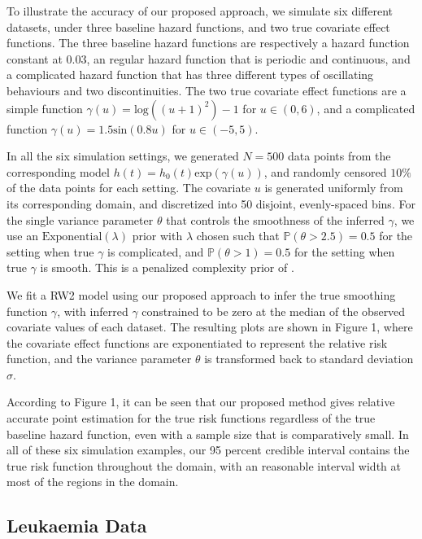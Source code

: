 \documentclass[ba]{imsart}
\begin{document}
To illustrate the accuracy of our proposed approach, we simulate six different datasets, under three baseline hazard functions, and two true covariate effect functions. The three baseline hazard functions are respectively a hazard function constant at 0.03, an regular hazard function that is periodic and continuous, and a complicated hazard function that has three different types of oscillating behaviours and two discontinuities. The two true covariate effect functions are a simple function $\gamma(u) = \text{log}((u + 1)^2) - 1$ for $u \in (0,6)$, and a complicated function $\gamma(u) = 1.5 \text{sin}(0.8 u)$ for $ u \in (-5,5)$.

In all the six simulation settings, we  generated $N = 500$ data points from the corresponding model $h(t) = h_{0}(t) \text{exp}(\gamma(u))$, and randomly censored $10\%$ of the data points for each setting. The covariate $u$ is generated uniformly from its corresponding domain, and discretized into 50 disjoint, evenly-spaced bins. For the single variance parameter $\theta$ that controls the smoothness of the inferred $\gamma$, we use an $\text{Exponential}(\lambda)$ prior with $\lambda$ chosen such that $\mathbb{P}\left( \theta > 2.5\right) = 0.5$ for the setting when true $\gamma$ is complicated, and $\mathbb{P}\left( \theta > 1\right) = 0.5$ for the setting when true $\gamma$ is smooth. This is a penalized complexity prior of \cite{pcprior}. 

We fit a RW2 model using our proposed approach to infer the true smoothing function $\gamma$, with inferred $\gamma$ constrained to be zero at the median of the observed covariate values of each dataset. The resulting plots are shown in Figure 1, where the covariate effect functions are exponentiated to represent the relative risk function, and the variance parameter $\theta$ is transformed back to standard deviation $\sigma$.

According to Figure 1, it can be seen that our proposed method gives relative accurate point estimation for the true risk functions regardless of the true baseline hazard function, even with a sample size that is comparatively small. In all of these six simulation examples, our 95 percent credible interval contains the true risk function throughout the domain, with an reasonable interval width at most of the regions in the domain. 

\subsection{Leukaemia Data}\label{subsec:leuk}
\end{document}
